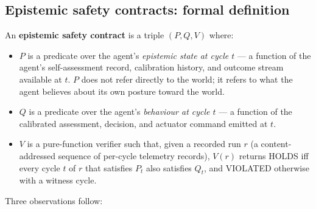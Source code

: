 \documentclass[11pt,a4paper]{article}
\begin{document}
\subsection{Epistemic safety contracts: formal definition}
\label{sec:epistemic-def}

An \textbf{epistemic safety contract} is a triple $(P, Q, V)$
where:

\begin{itemize}[noitemsep,topsep=2pt]
  \item $P$ is a predicate over the agent's \emph{epistemic state
        at cycle $t$} --- a function of the agent's self-assessment
        record, calibration history, and outcome stream available
        at $t$. $P$ does not refer directly to the world; it
        refers to what the agent believes about its own posture
        toward the world.
  \item $Q$ is a predicate over the agent's \emph{behaviour at
        cycle $t$} --- a function of the calibrated assessment,
        decision, and actuator command emitted at $t$.
  \item $V$ is a pure-function verifier such that, given a
        recorded run $r$ (a content-addressed sequence of
        per-cycle telemetry records), $V(r)$ returns HOLDS iff
        every cycle $t$ of $r$ that satisfies $P_t$ also satisfies
        $Q_t$, and VIOLATED otherwise with a witness cycle.
\end{itemize}

Three observations follow:
\end{document}
